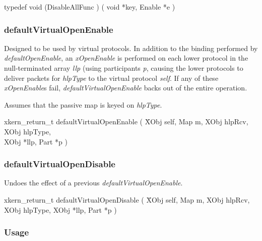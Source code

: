 \medskip

{\sem typedef void} ({\bold *DisableAllFunc} )
(
{\sem void} *{\caps key}, 
{\sem Enable} *{\caps e}
)


\subsubsection{defaultVirtualOpenEnable}

Designed to be used by virtual protocols.  In addition to the binding
performed by {\em defaultOpenEnable}, an {\em xOpenEnable} is
performed on each lower protocol in the null-terminated array 
{\em llp} (using participants {\em p}, 
causing the lower protocols to deliver packets for 
{\em hlpType} to the virtual protocol {\em self}.  If any of these
{\em xOpenEnable}s fail, {\em defaultVirtualOpenEnable} backs out of
the entire operation.

Assumes that the passive map is keyed on {\em hlpType}.

\medskip

\begin{tabbing}

\indent
{\sem xkern\_return\_t} {\bold defaultVirtualOpenEnable} 
( \= 
{\sem XObj} {\caps self}, 
{\sem Map} {\caps m}, 
{\sem XObj} {\caps hlpRcv}, 
{\sem XObj} {\caps hlpType}, \\
\> {\sem XObj} *{\caps llp}, 
{\sem Part} *{\caps p}
)

\end{tabbing}

\subsubsection{defaultVirtualOpenDisable}

Undoes the effect of a previous {\em defaultVirtualOpenEnable}.

\medskip

\begin{tabbing}

\indent
{\sem xkern\_return\_t} {\bold defaultVirtualOpenDisable} 
( \=
{\sem XObj} {\caps self}, 
{\sem Map} {\caps m}, 
{\sem XObj} {\caps hlpRcv}, \\
\> {\sem XObj} {\caps hlpType}, 
{\sem XObj} *{\caps llp}, 
{\sem Part} *{\caps p}
)

\end{tabbing}



\subsubsection {Usage}

